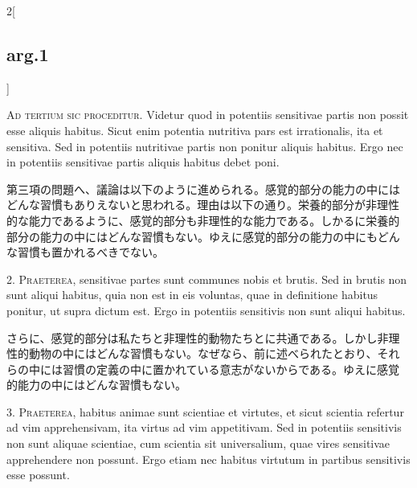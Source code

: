 \documentclass[paper=a4paper,fontsize=10pt,jafontsize=9pt,titlepage]{jlreq}
\begin{document}
\begin{paracol}{2}[\subsection{arg.1}]

{\scshape Ad tertium sic proceditur}. Videtur quod in potentiis
 sensitivae partis non possit esse aliquis habitus. Sicut enim
 potentia nutritiva pars est irrationalis, ita et sensitiva. Sed in
 potentiis nutritivae partis non ponitur aliquis habitus. Ergo nec in
 potentiis sensitivae partis aliquis habitus debet poni.

\switchcolumn

第三項の問題へ、議論は以下のように進められる。感覚的部分の能力の中には
どんな習慣もありえないと思われる。理由は以下の通り。栄養的部分が非理性
的な能力であるように、感覚的部分も非理性的な能力である。しかるに栄養的
部分の能力の中にはどんな習慣もない。ゆえに感覚的部分の能力の中にもどん
な習慣も置かれるべきでない。


2. {\scshape Praeterea}, sensitivae partes sunt communes nobis et brutis. Sed in
 brutis non sunt aliqui habitus, quia non est in eis voluntas, quae in
 definitione habitus ponitur, ut supra dictum est. Ergo in potentiis
 sensitivis non sunt aliqui habitus.

\switchcolumn

さらに、感覚的部分は私たちと非理性的動物たちとに共通である。しかし非理
性的動物の中にはどんな習慣もない。なぜなら、前に述べられたとおり、それ
らの中には習慣の定義の中に置かれている意志がないからである。ゆえに感覚
的能力の中にはどんな習慣もない。


3. {\scshape Praeterea}, habitus animae sunt scientiae et virtutes, et
sicut scientia refertur ad vim apprehensivam, ita virtus ad vim
appetitivam. Sed in potentiis sensitivis non sunt aliquae scientiae,
cum scientia sit universalium, quae vires sensitivae apprehendere non
possunt. Ergo etiam nec habitus virtutum in partibus sensitivis esse
possunt.

\switchcolumn


\end{paracol}
\end{document}
